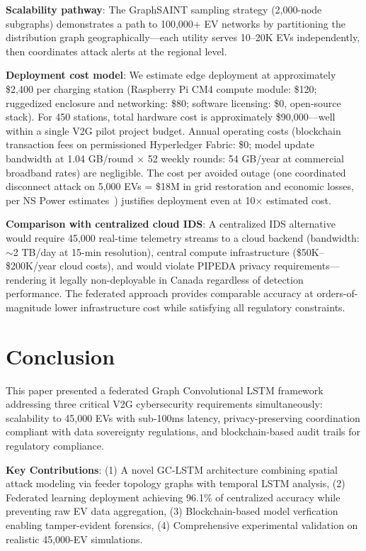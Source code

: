 \documentclass[journal]{IEEEtran}
\begin{document}
\textbf{Scalability pathway}: The GraphSAINT sampling strategy (2,000-node subgraphs) demonstrates a path to 100,000+ EV networks by partitioning the distribution graph geographically—each utility serves 10--20K EVs independently, then coordinates attack alerts at the regional level.

\textbf{Deployment cost model}: We estimate edge deployment at approximately \$2,400 per charging station (Raspberry Pi CM4 compute module: \$120; ruggedized enclosure and networking: \$80; software licensing: \$0, open-source stack). For 450 stations, total hardware cost is approximately \$90,000—well within a single V2G pilot project budget. Annual operating costs (blockchain transaction fees on permissioned Hyperledger Fabric: \$0; model update bandwidth at 1.04 GB/round $\times$ 52 weekly rounds: 54 GB/year at commercial broadband rates) are negligible. The cost per avoided outage (one coordinated disconnect attack on 5,000 EVs = \$18M in grid restoration and economic losses, per NS Power estimates~\cite{NS2030}) justifies deployment even at 10$\times$ estimated cost.

\textbf{Comparison with centralized cloud IDS}: A centralized IDS alternative would require 45,000 real-time telemetry streams to a cloud backend (bandwidth: $\sim$2 TB/day at 15-min resolution), central compute infrastructure (\$50K--\$200K/year cloud costs), and would violate PIPEDA privacy requirements—rendering it legally non-deployable in Canada regardless of detection performance. The federated approach provides comparable accuracy at orders-of-magnitude lower infrastructure cost while satisfying all regulatory constraints.

\section{Conclusion}

This paper presented a federated Graph Convolutional LSTM framework addressing three critical V2G cybersecurity requirements simultaneously: scalability to 45,000 EVs with sub-100ms latency, privacy-preserving coordination compliant with data sovereignty regulations, and blockchain-based audit trails for regulatory compliance. 

\textbf{Key Contributions}: (1) A novel GC-LSTM architecture combining spatial attack modeling via feeder topology graphs with temporal LSTM analysis, (2) Federated learning deployment achieving 96.1\% of centralized accuracy while preventing raw EV data aggregation, (3) Blockchain-based model verfication enabling tamper-evident forensics, (4) Comprehensive experimental validation on realistic 45,000-EV simulations.
\end{document}
